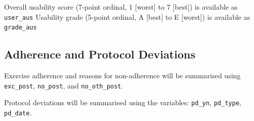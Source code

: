 \documentclass[11pt,parskip=half-]{scrartcl}
\begin{document}
Overall usability score (7-point ordinal, 1 [worst] to 7 [best]) is available as \texttt{user\_aus}
Usability grade (5-point ordinal, A [best] to E [worst]) is available as \texttt{grade\_aus}

\clearpage

\subsection*{Adherence and Protocol Deviations}

Exercise adherence and reasons for non-adherence will be summarised using \texttt{exc\_post}, \texttt{no\_post}, and \texttt{no\_oth\_post}.

Protocol deviations will be summarised using the variables: \texttt{pd\_yn}, \texttt{pd\_type}, \texttt{pd\_date}.
\end{document}
